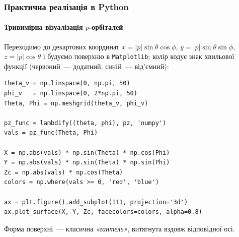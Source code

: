 \documentclass[]{beamer}
\begin{document}
\begin{frame}[fragile]
	\frametitle{Практична реалізація в Python}
	\framesubtitle{Тривимірна візуалізація $p$-орбіталей}

	Переходимо до декартових координат $x=|p|\sin\theta\cos\phi$, $y=|p|\sin\theta\sin\phi$, $z=|p|\cos\theta$ і будуємо поверхню в \texttt{Matplotlib}; колір кодує знак хвильової функції (червоний~--- додатний, синій~--- від'ємний):
	\begin{verbatim}
theta_v = np.linspace(0, np.pi, 50)
phi_v   = np.linspace(0, 2*np.pi, 50)
Theta, Phi = np.meshgrid(theta_v, phi_v)

pz_func = lambdify((theta, phi), pz, 'numpy')
vals = pz_func(Theta, Phi)

X = np.abs(vals) * np.sin(Theta) * np.cos(Phi)
Y = np.abs(vals) * np.sin(Theta) * np.sin(Phi)
Zc = np.abs(vals) * np.cos(Theta)
colors = np.where(vals >= 0, 'red', 'blue')

ax = plt.figure().add_subplot(111, projection='3d')
ax.plot_surface(X, Y, Zc, facecolors=colors, alpha=0.8)
	\end{verbatim}

	Форма поверхні~--- класична \emph{«гантель»}, витягнута вздовж відповідної осі.
\end{frame}
\end{document}
